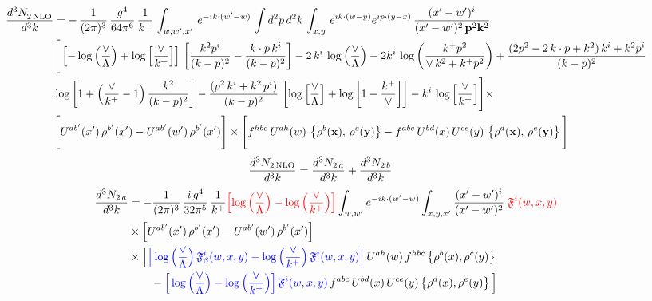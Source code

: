 \documentclass[9pt]{article}
\numberwithin{equation}{section}
\begin{document}
\begin{align}
   \frac{d^{3}N_{2\,\rm NLO}^{\rm}}{d^{3}k} &  = -\,\frac{1}{(2\pi)^{3}}\,\frac{g^{4}}{64\pi^{6}}\, \frac{1}{k^{+}}\,\int_{w,w',x'}\, e^{-ik\cdot (w'-w)}\,\int d^{2}p\,d^{2}k\,\int_{x,y}\, e^{ik\cdot (w-y)} e^{ip\cdot (y-x)}\, \frac{(x'-w')^{i}}{(x'-w')^{2}\,\mathbf{p}^{2}\mathbf{k}^{2} }\notag \\ & \Bigg[\left[-\log{\left(\frac{\vee}{\Lambda}\right)}+\log{\left[\frac{\vee}{k^{+}}\right]}\right]\,\left[\frac{k^{2}p^{i}}{(k-p)^{2}}-\frac{k\cdot p\,k^{i}}{(k-p)^{2}}\right]-2\,k^{i}\,\log{\left(\frac{\vee}{\Lambda}\right)} -2k^{i}\,\log{\left(\frac{k^{+}p^{2}}{\vee\, k^{2}+k^{+}p^{2}}\right)}+\frac{(2p^{2}-2\,k\cdot p + k^{2})\,k^{i} + k^{2}p^{i}}{(k-p)^{2}}\notag \\ &  \log{\left[1+\left(\frac{\vee}{k^{+}}-1\right)\frac{k^{2}}{(k-p)^{2}}\right]} - \frac{(p^{2}\,k^{i}+k^{2}\,p^{i})}{(k-p)^{2}}\,\left[\log{\left[\frac{\vee}{\Lambda}\right]}+\log{\left[1-\frac{k^{+}}{\vee}\right]}\right]-k^{i}\,\log{\left[\frac{\vee}{k^{+}}\right]}\Bigg]\times\,\notag \\ &  \Bigg[U^{ab'}(x')\,\rho^{b'}(x') - U^{ab'}(w')\,\rho^{b'}(x')\Bigg]\times\Bigg[f^{hbc}\,U^{ah}(w)\,\left\{ \rho^{b}(\mathbf{x}),\,\rho^{c}(\mathbf{y})\right\}-f^{abc}\,U^{bd}(x)\, U^{ce}(y)\, \left\{\rho^{d}(\mathbf{x}),\,\rho^{e}(\mathbf{y})\right\}\Bigg]
\end{align}
\begin{align}
\frac{d^{3}N_{2\,\rm NLO}}{d^{3}k} &= \frac{d^{3}N_{2\,a}}{d^{3}k} + \frac{d^{3}N_{2\,b}}{d^{3}k}
\end{align}
\begin{align}
\frac{d^{3}N_{2\,a}}{d^{3}k} & = -\frac{1}{(2\pi)^{3}}\,\frac{i\,g^{4}}{32\pi^{5}}\,\frac{1}{k^{+}}
{\color{red}\left[\log\left(\frac{\vee}{\Lambda}\right)-\log\left(\frac{\vee}{k^{+}}\right)\right]}
\int_{w,w'} e^{-ik\cdot(w'-w)}\int_{x,y,x'}\frac{(x'-w')^{i}}{(x'-w')^{2}}\;{\color{red}\mathfrak{F}^{i}(w,x,y)}\notag\\
&\times\Big[U^{ab'}(x')\,\rho^{b'}(x')-U^{ab'}(w')\,\rho^{b'}(x')\Big]\notag\\
&\times\Big[{\color{blue}\Big[\log\Big(\frac{\vee}{\Lambda}\Big)\,\mathfrak{F}^{i}_{\beta}(w,x,y)-\log\Big(\frac{\vee}{k^{+}}\Big)\,\mathfrak{F}^{i}(w,x,y)\Big]}\,U^{ah}(w)\,f^{hbc}\left\{\rho^{b}(x),\rho^{c}(y)\right\}\notag\\
&\qquad-{\color{blue}\Big[\log\Big(\frac{\vee}{\Lambda}\Big)-\log\Big(\frac{\vee}{k^{+}}\Big)\Big]\,\mathfrak{F}^{i}(w,x,y)}\,f^{abc}\,U^{bd}(x)\,U^{ce}(y)\left\{\rho^{d}(x),\rho^{e}(y)\right\}\Big]
\end{align}
\end{document}
